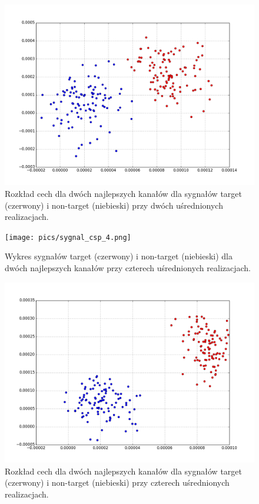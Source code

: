 \documentclass[licencjacka,openright]{pracamgr}
\begin{document}
\begin{figure}[H]
\centering
\includegraphics[scale=0.55, trim=0mm 0mm 0mm 0mm, clip=True]{pics/cecha_csp_2.png}
\caption{Rozkład cech dla dwóch najlepszych kanałów dla sygnałów target (czerwony) i non-target (niebieski) przy dwóch uśrednionych realizacjach.}
\label{cecha_csp_2}
\end{figure}


\begin{figure}[H]
\centering
\texttt{[image: pics/sygnal\_csp\_4.png]}
\caption{Wykres sygnałów target (czerwony) i non-target (niebieski) dla dwóch najlepszych kanałów przy czterech uśrednionych realizacjach.}
\label{sygnal_csp_4}
\end{figure}

\begin{figure}[H]
\centering
\includegraphics[scale=0.55, trim=0mm 0mm 0mm 0mm, clip=True]{pics/cecha_csp_4.png}
\caption{Rozkład cech dla dwóch najlepszych kanałów dla sygnałów target (czerwony) i non-target (niebieski) przy czterech uśrednionych realizacjach.}
\label{cecha_csp_4}
\end{figure}
\end{document}
